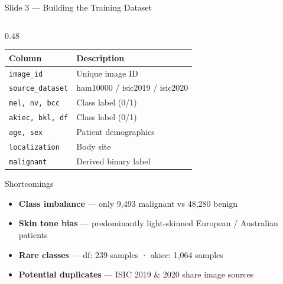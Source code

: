 \documentclass[aspectratio=169, 9pt]{beamer}
\begin{document}
\begin{frame}{Slide 3 --- Building the Training Dataset}
\begin{columns}[T]
\begin{column}{0.48\textwidth}
      \vspace{0.3em}
      {\small
      \begin{tabular}{@{} ll @{}}
        \toprule
        Column & Description \\
        \midrule
        \texttt{image\_id}       & Unique image ID \\
        \texttt{source\_dataset} & ham10000 / isic2019 / isic2020 \\
        \texttt{mel, nv, bcc}   & Class label (0/1) \\
        \texttt{akiec, bkl, df} & Class label (0/1) \\
        \texttt{age, sex}       & Patient demographics \\
        \texttt{localization}   & Body site \\
        \texttt{malignant}      & Derived binary label \\
        \bottomrule
      \end{tabular}
      }

      \vspace{0.6em}
      \begin{alertblock}{Shortcomings}
        \small
        \begin{itemize}[leftmargin=1em, itemsep=0pt]
          \item \textbf{Class imbalance} --- only 9,493 malignant vs 48,280 benign
          \item \textbf{Skin tone bias} --- predominantly light-skinned European / Australian patients
          \item \textbf{Rare classes} --- df: 239 samples · akiec: 1,064 samples
          \item \textbf{Potential duplicates} --- ISIC 2019 \& 2020 share image sources
        \end{itemize}
      \end{alertblock}
    \end{column}

  \end{columns}
\end{frame}
\end{document}
